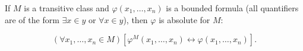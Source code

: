 If $M$ is a transitive class and $\varphi(x_1, \ldots, x_n)$ is a bounded formula (all quantifiers are of the form $\exists x \in y$ or $\forall x \in y$), then $\varphi$ is absolute for $M$:

$$(\forall x_1, \ldots, x_n \in M)[\varphi^M(x_1, \ldots, x_n) \leftrightarrow \varphi(x_1, \ldots, x_n)].$$
